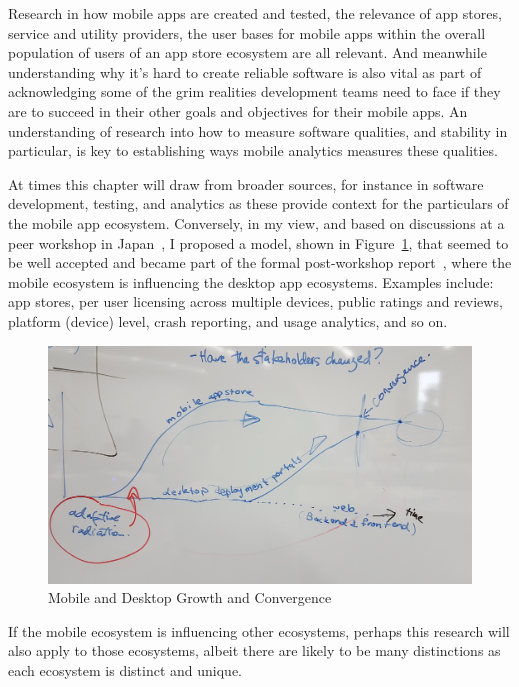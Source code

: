 Research in how mobile apps are created and tested, the relevance of app stores, service and utility providers, the user bases for mobile apps within the overall population of users of an app store ecosystem are all relevant. And meanwhile understanding why it's hard to create reliable software is also vital as part of acknowledging some of the grim realities development teams need to face if they are to succeed in their other goals and objectives for their mobile apps. An understanding of research into how to measure software qualities, and stability in particular, is key to establishing ways mobile analytics measures these qualities. 

At times this chapter will draw from broader sources, for instance in software development, testing, and analytics as these provide context for the particulars of the mobile app ecosystem. Conversely, in my view, and based on discussions at a peer workshop in Japan~, I proposed a model, shown in Figure~\ref{fig:my_shonan_hysteresis_sketch}, that seemed to be well accepted and became part of the formal post-workshop report~, where the mobile ecosystem is influencing the desktop app ecosystems. Examples include: app stores, per user licensing across multiple devices, public ratings and reviews, platform (device) level, crash reporting, and usage analytics, and so on.

\begin{figure}
    \centering
    \includegraphics[width=\linewidth]{images/nii-shonan-workshop-152/shonan_hysteresis_diagram_20191210_132528.jpg}
    \caption{Mobile and Desktop Growth and Convergence}
    \label{fig:my_shonan_hysteresis_sketch}
\end{figure}

If the mobile ecosystem is influencing other ecosystems, perhaps this research will also apply to those ecosystems, albeit there are likely to be many distinctions as each ecosystem is distinct and unique.

